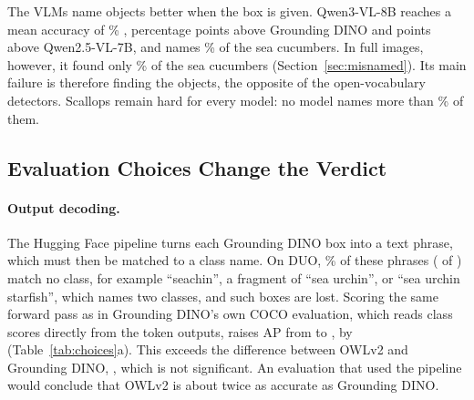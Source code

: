 \documentclass[letterpaper]{article} %
\begin{document}
The VLMs name objects better when the box is given. Qwen3-VL-8B reaches a mean accuracy of \cropQwenVL\% \cropciQwenVL, \cropdGD{} percentage points \cropdciGD{} above Grounding DINO and \cropdQSeven{} points \cropdciQSeven{} above Qwen2.5-VL-7B, and names \cropCucQwenVL\% of the sea cucumbers. In full images, however, it found only \scFoundQwenVL\% of the sea cucumbers (Section~\ref{sec:misnamed}). Its main failure is therefore finding the objects, the opposite of the open-vocabulary detectors. Scallops remain hard for every model: no model names more than \cropScalMax\% of them.

\subsection{Evaluation Choices Change the Verdict}
\label{sec:choices}





\paragraph{Output decoding.}
The Hugging Face pipeline turns each Grounding DINO box into a text phrase, which must then be matched to a class name. On DUO, \pctUnmatchedText\% of these phrases (\nUnmatchedText{} of \nBoxesText) match no class, for example ``seachin'', a fragment of ``sea urchin'', or ``sea urchin starfish'', which names two classes, and such boxes are lost. Scoring the same forward pass as in Grounding DINO's own COCO evaluation, which reads class scores directly from the token outputs, raises AP from \apGDtext{} to \apGD{}, by \dDecoding{} \dciDecoding{} (Table~\ref{tab:choices}a). This exceeds the difference between OWLv2 and Grounding DINO, \dOwlGd{} \dciOwlGd, which is not significant. An evaluation that used the pipeline would conclude that OWLv2 is about twice as accurate as Grounding DINO.
\end{document}
